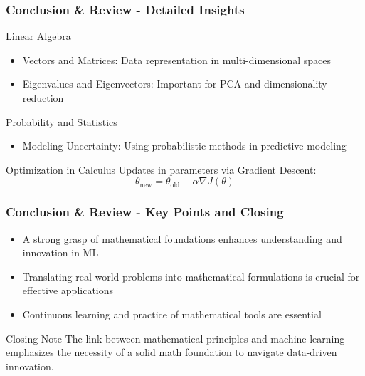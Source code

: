 \documentclass{beamer}
\begin{document}
\begin{frame}[fragile]
    \frametitle{Conclusion \& Review - Detailed Insights}
    \begin{block}{Linear Algebra}
        \begin{itemize}
            \item Vectors and Matrices: Data representation in multi-dimensional spaces
            \item Eigenvalues and Eigenvectors: Important for PCA and dimensionality reduction
        \end{itemize}
    \end{block}
    
    \begin{block}{Probability and Statistics}
        \begin{itemize}
            \item Modeling Uncertainty: Using probabilistic methods in predictive modeling
        \end{itemize}
    \end{block}
    
    \begin{block}{Optimization in Calculus}
        Updates in parameters via Gradient Descent:
        \begin{equation}
            \theta_{\text{new}} = \theta_{\text{old}} - \alpha \nabla J(\theta)
        \end{equation}
    \end{block}
\end{frame}

\begin{frame}[fragile]
    \frametitle{Conclusion \& Review - Key Points and Closing}
    \begin{itemize}
        \item A strong grasp of mathematical foundations enhances understanding and innovation in ML
        \item Translating real-world problems into mathematical formulations is crucial for effective applications
        \item Continuous learning and practice of mathematical tools are essential
    \end{itemize}
    
    \begin{block}{Closing Note}
        The link between mathematical principles and machine learning emphasizes the necessity of a solid math foundation to navigate data-driven innovation.
    \end{block}
\end{frame}
\end{document}
